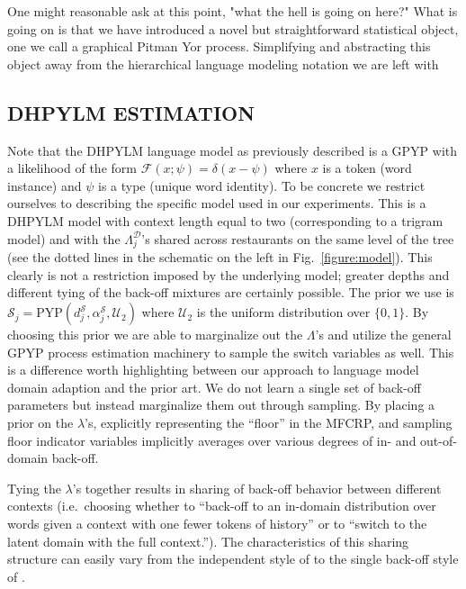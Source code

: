 \documentclass{article}
\begin{document}
{One might reasonable ask at this point, "what the hell is going on here?"  What is going on is that we have introduced a novel but straightforward statistical object, one we call a graphical Pitman Yor process.  Simplifying and abstracting this object away from the hierarchical language modeling notation we are left with

}
\subsection{DHPYLM ESTIMATION}

Note that the DHPYLM language model as previously described is a GPYP with a likelihood of the form  $\mathcal{F}(x;\psi) = \delta(x-\psi)$ where $x$ is a token (word instance) and $\psi$ is a type (unique word identity).   To be concrete we restrict ourselves to describing the specific model used in our experiments.  This is a DHPYLM model with context length equal to two (corresponding to a trigram model) and with the $\Lambda_j^\mathcal{D}$'s shared across restaurants on the same level of the tree (see the dotted lines in the schematic on the left in Fig.~\ref{figure:model}).  This clearly is not a restriction imposed by the underlying model; greater depths and different tying of the back-off mixtures are certainly possible.  The prior we use is $\mathcal{S}_j =  \text{PYP}(d_j^\mathcal{S},\alpha_j^\mathcal{S},\mathcal{U}_2)$ where $\mathcal{U}_2$ is the uniform distribution over $\{0,1\}.$   By choosing this prior we are able to marginalize out the $\Lambda$'s and utilize the general GPYP process estimation machinery to sample the switch variables as well.  This is a difference worth highlighting between our approach to language model domain adaption and the prior art.  We do not learn a single set of back-off parameters but instead marginalize them out through sampling.  By placing a prior on the $\lambda$'s, explicitly representing the ``floor'' in the MFCRP, and sampling floor indicator variables implicitly averages over various degrees of in- and out-of-domain back-off.

Tying the $\lambda$'s together results in sharing of back-off behavior between different contexts (i.e.~choosing whether to ``back-off to an in-domain distribution over words given a context with one fewer tokens of history'' or to ``switch to the latent domain with the full context.'').  The characteristics of this sharing structure can easily vary from the independent style of \cite{knesers93} to the single back-off style of \cite{bacchianis06}.
\end{document}
